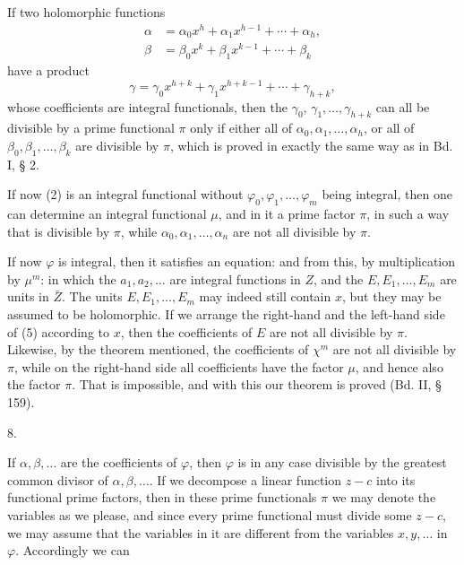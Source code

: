 
If two holomorphic functions
\[
\begin{aligned}
\alpha &= \alpha_0 x^h + \alpha_1 x^{h-1} + \cdots + \alpha_h, \\
\beta &= \beta_0 x^k + \beta_1 x^{k-1} + \cdots + \beta_k
\end{aligned}
\]
have a product
\[
\gamma = \gamma_0 x^{h+k} + \gamma_1 x^{h+k-1} + \cdots + \gamma_{h+k},
\]
whose coefficients are integral functionals, then the $\gamma_0$,
$\gamma_1, \ldots, \gamma_{h+k}$ can all be divisible by a prime functional $\pi$
only if either all of $\alpha_0, \alpha_1, \ldots, \alpha_h$, or all of $\beta_0, \beta_1, \ldots, \beta_k$
are divisible by $\pi$, which is proved in exactly the same way as in Bd. I, § 2.

If now (2) is an integral functional without $\varphi_0, \varphi_1, \ldots, \varphi_m$
being integral, then one can determine an integral functional $\mu$, and in it a
prime factor $\pi$, in such a way that
is divisible by $\pi$, while $\alpha_0, \alpha_1, \ldots, \alpha_n$ are not all divisible by $\pi$.

If now $\varphi$ is integral, then it satisfies an equation:
and from this, by multiplication by $\mu^m$:
in which the $a_1, a_2, \ldots$ are integral functions in $Z$, and the $E, E_1, \ldots, E_m$
are units in $\bar{Z}$. The units $E, E_1, \ldots, E_m$ may indeed still
contain $x$, but they may be assumed to be holomorphic.
If we arrange the right-hand and the left-hand side of (5) according to $x$, then
the coefficients of $E$ are not all divisible by $\pi$. Likewise,
by the theorem mentioned, the coefficients of $\chi^m$ are not
all divisible by $\pi$, while on the right-hand side all coefficients
have the factor $\mu$, and hence also the factor $\pi$. That is
impossible, and with this our theorem is proved (Bd. II, § 159).

8. 

If $\alpha, \beta, \ldots$ are the coefficients of $\varphi$, then $\varphi$ is in any case
divisible by the greatest common divisor of $\alpha, \beta, \ldots$.
If we decompose a linear function $z - c$ into its functional prime
factors, then in these prime functionals $\pi$ we may denote the variables
as we please, and since every prime functional must divide some $z - c$,
we may assume that the variables in it are different from the
variables $x, y, \ldots$ in $\varphi$. Accordingly we can
